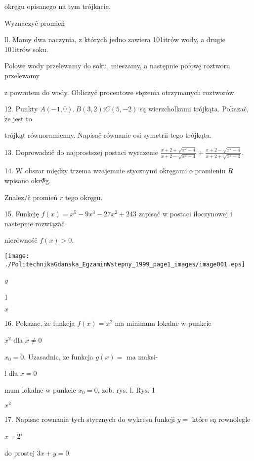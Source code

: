 \documentclass[a4paper,12pt]{article}
\begin{document}
okręgu opisanego na tym trójkącie.

Wyznaczyč promień

ll. Mamy dwa naczynia, z których jedno zawiera 101itrów wody, a drugie 101itrów soku.

Polowe wody przelewamy do soku, mieszamy, a następnie pofowę roztworu przelewamy

z powrotem do wody. Obliczyč procentowe stęzenia otrzymanych roztworów.

12. Punkty $A(-1,0), B(3,2) \mathrm{i} C(5,-2)$ są wierzcholkami trójkąta. Pokazač, $\dot{\mathrm{z}}\mathrm{e}$ jest to

trójkąt równoramienny. Napisač równanie osi symetrii tego trójkąta.

13. Doprowadzič do najprostszej postaci wyrazenie $\displaystyle \frac{x+2+\sqrt{x^{2}-4}}{x+2-\sqrt{x^{2}-4}}+\frac{x+2-\sqrt{x^{2}-4}}{x+2+\sqrt{x^{2}-4}}.$

14. $\mathrm{W}$ obszar między trzema wzajemnie stycznymi okręgami o promieniu $R$ wpisano $\mathrm{o}\mathrm{k}\mathrm{r}\Phi \mathrm{g}.$

Znalez/č promień $r$ tego okręgu.

15. Funkcję $f(x)=x^{5}-9x^{3}-27x^{2}+243$ zapisač w postaci iloczynowej i nastepnie rozwiązač

nierównośč $f(x)>0.$



\begin{center}
\texttt{[image: ./PolitechnikaGdanska\_EgzaminWstepny\_1999\_page1\_images/image001.eps]}
\end{center}
{\it y}

1

$x$

16. Pokazac, $\dot{\mathrm{z}}\mathrm{e}$ funkcja $f(x) = x^{2}$ ma minimum lokalne w punkcie

$x^{2}$ dla $x\neq 0$

$x_{0} = 0$. Uzasadnic, $\dot{\mathrm{z}}\mathrm{e}$ funkcja $g(x) =$ ma maksi-

l dla $x=0$

mum lokalne w punkcie $x_{0}=0$, zob. rys. l. $\mathrm{R}\mathrm{y}\mathrm{s}$. 1

$x^{2}$

17. Napisac rownania tych stycznych do wykresu funkcji $y=$ które są rownolegle

$x-2$'

do prostej $3x+y=0.$
\end{document}
